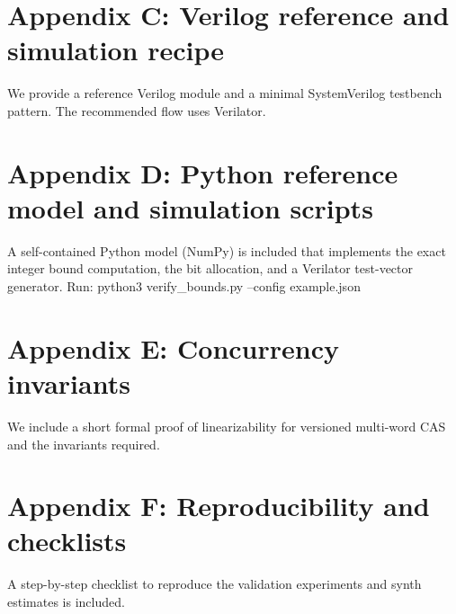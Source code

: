 \documentclass[11pt]{article}
\theoremstyle{definition}
\theoremstyle{plain}
\begin{document}

\section{Appendix C: Verilog reference and simulation recipe}
\label{app:verilog}
We provide a reference Verilog module and a minimal SystemVerilog testbench pattern.  The recommended flow uses Verilator.


\section{Appendix D: Python reference model and simulation scripts}
\label{app:sim}
A self-contained Python model (NumPy) is included that implements the exact integer bound computation, the bit allocation, and a Verilator test-vector generator.  Run: python3 verify_bounds.py --config example.json

\section{Appendix E: Concurrency invariants}
\label{app:concurrency}
We include a short formal proof of linearizability for versioned multi-word CAS and the invariants required.

\section{Appendix F: Reproducibility and checklists}
A step-by-step checklist to reproduce the validation experiments and synth estimates is included.
\end{document}
